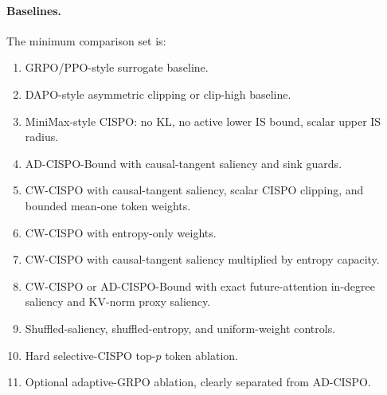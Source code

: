 \documentclass[11pt]{article}
\begin{document}
\paragraph{Baselines.}
The minimum comparison set is:
\begin{enumerate}[leftmargin=*]
  \item GRPO/PPO-style surrogate baseline.
  \item DAPO-style asymmetric clipping or clip-high baseline.
  \item MiniMax-style CISPO: no KL, no active lower IS bound, scalar upper
  IS radius.
  \item AD-CISPO-Bound with causal-tangent saliency and sink guards.
  \item CW-CISPO with causal-tangent saliency, scalar CISPO clipping, and
  bounded mean-one token weights.
  \item CW-CISPO with entropy-only weights.
  \item CW-CISPO with causal-tangent saliency multiplied by entropy capacity.
  \item CW-CISPO or AD-CISPO-Bound with exact future-attention in-degree
  saliency and KV-norm proxy saliency.
  \item Shuffled-saliency, shuffled-entropy, and uniform-weight controls.
  \item Hard selective-CISPO top-$p$ token ablation.
  \item Optional adaptive-GRPO ablation, clearly separated from AD-CISPO.
\end{enumerate}
\end{document}

